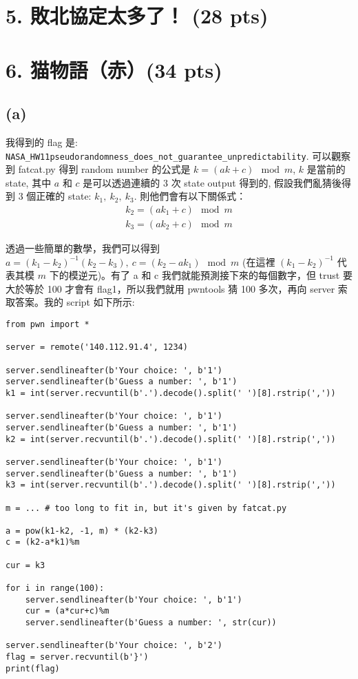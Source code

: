 \documentclass[12pt]{article}
\begin{document}
\newpage
\section*{5. 敗北協定太多了！ (28 pts)}

\newpage
\section*{6. 猫物語（赤）(34 pts)}
\subsection*{(a)}
我得到的 flag 是: \texttt{NASA\_HW11{pseudorandomness\_does\_not\_guarantee\_unpredictability}}. 可以觀察到 fatcat.py 得到 random number 的公式是 $k=(ak+c)\mod{m}$, $k$ 是當前的 state, 其中 $a$ 和 $c$ 是可以透過連續的 3 次 state output 得到的, 假設我們亂猜後得到 3 個正確的 state: $k_1,\ k_2,\ k_3$. 則他們會有以下關係式：
\begin{align*}
    k_2=(ak_1+c)\mod{m} \\
    k_3=(ak_2+c)\mod{m}
\end{align*}

透過一些簡單的數學，我們可以得到 $a=(k_1-k_2)^{-1}(k_2-k_3),\ c=(k_2-ak_1)\mod{m}$ (在這裡 $(k_1-k_2)^{-1}$ 代表其模 $m$ 下的模逆元)。有了 a 和 c 我們就能預測接下來的每個數字，但 trust 要大於等於 100 才會有 flag1，所以我們就用 pwntools 猜 100 多次，再向 server 索取答案。我的 script 如下所示:
\begin{verbatim}
from pwn import *

server = remote('140.112.91.4', 1234)

server.sendlineafter(b'Your choice: ', b'1')
server.sendlineafter(b'Guess a number: ', b'1')
k1 = int(server.recvuntil(b'.').decode().split(' ')[8].rstrip(','))

server.sendlineafter(b'Your choice: ', b'1')
server.sendlineafter(b'Guess a number: ', b'1')
k2 = int(server.recvuntil(b'.').decode().split(' ')[8].rstrip(','))

server.sendlineafter(b'Your choice: ', b'1')
server.sendlineafter(b'Guess a number: ', b'1')
k3 = int(server.recvuntil(b'.').decode().split(' ')[8].rstrip(','))

m = ... # too long to fit in, but it's given by fatcat.py

a = pow(k1-k2, -1, m) * (k2-k3)
c = (k2-a*k1)%m

cur = k3

for i in range(100):
    server.sendlineafter(b'Your choice: ', b'1')
    cur = (a*cur+c)%m
    server.sendlineafter(b'Guess a number: ', str(cur))

server.sendlineafter(b'Your choice: ', b'2')
flag = server.recvuntil(b'}')
print(flag)
\end{verbatim}
\end{document}
